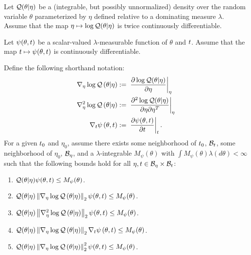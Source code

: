 \begin{assu}
%
Let $\mathcal{Q}(\theta \vert \eta)$ be a (integrable, but possibly unnormalized) density
over the random variable $\theta$ parameterized by $\eta$ defined relative to a
dominating measure $\lambda$.  Assume that the map $\eta \mapsto \log \mathcal{Q}(\theta
\vert \eta)$ is twice continuously differentiable.

Let $\psi(\theta, t)$ be a scalar-valued $\lambda$-measurable function of
$\theta$ and $t$.  Assume that the map $t \mapsto \psi(\theta, t)$ is
continuously differentiable.

Define the following shorthand notation:
%
\begin{align*}
%
\lqgrad{\theta \vert \eta} :={}&
    \fracat{\partial \log \q(\theta \vert \eta)}{\partial \eta}{\eta} \\
%
\lqhess{\theta \vert \eta} :={}&
    \fracat{\partial^2 \log \q(\theta \vert \eta)}
           {\partial \eta \partial \eta^T}{\eta} \\
%
\psigrad{\theta, \t} :={}& \fracat{\partial \psi(\theta, \t)}{\partial \t}{\t}.
%
\end{align*}
%
For a given $t_0$ and $\eta_0$, assume there exists some neighborhood of
$t_0$, $\mathcal{B}_t$, some neighborhood of $\eta_0$, $\mathcal{B}_\eta$, and a
$\lambda$-integrable $M_\psi(\theta)$ with $\int M_\psi(\theta) \lambda(d\theta) <
\infty$ such that the following bounds hold for all $\eta, t \in \mathcal{B}_\eta
\times \mathcal{B}_t$:
%
\begin{enumerate}
%
\item {}
$\mathcal{Q}(\theta \vert \eta) \psi(\theta, t) \le M_\psi(\theta)$.
%
\item {}
$\mathcal{Q}(\theta \vert \eta) \left\Vert{\nabla_\eta \log \mathcal{Q}}\left(\theta \vert \eta\right)\right\Vert_2 \psi(\theta, t) \le
M_\psi(\theta)$.
%
\item {}
$\mathcal{Q}(\theta \vert \eta) \left\Vert{\nabla_\eta^2 \log \mathcal{Q}}\left(\theta \vert \eta\right)\right\Vert_2 \psi(\theta, t) \le
M_\psi(\theta)$.
%
\item {}
$\mathcal{Q}(\theta \vert \eta) \left\Vert{\nabla_\eta \log \mathcal{Q}}\left(\theta \vert \eta\right)\right\Vert_2 {\nabla_t \psi}\left(\theta, t\right)
\le M_\psi(\theta)$.
%
\item {}
$\mathcal{Q}(\theta \vert \eta) \left\Vert{\nabla_\eta \log \mathcal{Q}}\left(\theta \vert \eta\right)\right\Vert^2_2 \psi(\theta, t) \le
M_\psi(\theta)$.
%
\end{enumerate}
%
\end{assu}

